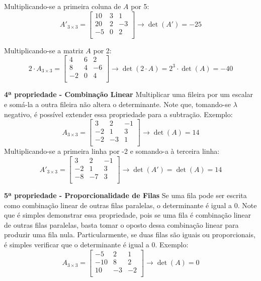 \documentclass[
  letterpaper,
  DIV=11,
  numbers=noendperiod]{scrreprt}
\begin{document}
Multiplicando-se a primeira coluna de \(A\) por 5: \[
A'_{3\times3} =
\begin{bmatrix}
    10 & 3 & 1  \\
    20 & 2 & -3 \\
    -5 & 0 & 2 \\
\end{bmatrix}
\rightarrow \det(A') = -25
\]

Multiplicando-se a matriz \(A\) por 2: \[
2\cdot A_{3\times3} =
\begin{bmatrix}
    4 & 6 & 2  \\
    8 & 4 & -6 \\
    -2 & 0 & 4 \\
\end{bmatrix}
\rightarrow \det(2 \cdot A) = 2^3 \cdot \det(A) = -40
\]

\textbf{4ª propriedade - Combinação Linear} Multiplicar uma fileira por
um escalar e somá-la a outra fileira não altera o determinante. Note
que, tomando-se \(\lambda\) negativo, é possível extender essa
propriedade para a subtração. Exemplo: \[
A_{3\times3} =
\begin{bmatrix}
    3 & 2 & -1  \\
    -2 & 1 & 3 \\
    -2 & -3 & 1 \\
\end{bmatrix}
\rightarrow \det(A) = 14
\] Multiplicando-se a primeira linha por -2 e somando-a à terceira
linha: \[
A'_{3\times3} =
\begin{bmatrix}
    3 & 2 & -1  \\
    -2 & 1 & 3 \\
    -8 & -7 & 3 \\
\end{bmatrix}
\rightarrow \det(A') = \det(A) = 14
\]

\textbf{5ª propriedade - Proporcionalidade de Filas} Se uma fila pode
ser escrita como combinação linear de outras filas paralelas, o
determinante é igual a \(0\). Note que é simples demonstrar essa
propriedade, pois se uma fila é combinação linear de outras filas
paralelas, basta tomar o oposto dessa combinação linear para produzir
uma fila nula. Particularmente, se duas filas são iguais ou
proporcionais, é simples verificar que o determinante é igual a \(0\).
Exemplo: \[
A_{3\times3} =
\begin{bmatrix}
    -5 & 2 & 1  \\
    -10 & 8 & 2 \\
    10 & -3 & -2 \\
\end{bmatrix}
\rightarrow \det(A) = 0
\]
\end{document}
